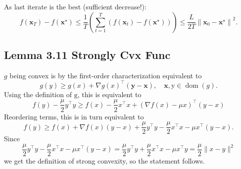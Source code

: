 As last iterate is the best (sufficient decrease!):
$$
f\left(\mathbf{x}_{T}\right)-f\left(\mathbf{x}^{\star}\right) \leq \frac{1}{T}\left(\sum_{t=1}^{T}\left(f\left(\mathbf{x}_{t}\right)-f\left(\mathbf{x}^{\star}\right)\right)\right) \leq \frac{L}{2 T}\left\|\mathbf{x}_{0}-\mathbf{x}^{\star}\right\|^{2} .
$$


\subsection*{Lemma 3.11 Strongly Cvx Func}
$g$ being convex is by the first-order characterization equivalent to
$$
g(y) \geq g(x)+\nabla g(x)^{\top}(\mathbf{y}-\mathbf{x}), \quad \mathbf{x}, \mathrm{y} \in \operatorname{dom}(g) .
$$
Using the definition of $\mathrm{g}$, this is equivalent to
$$
f(y)-\frac{\mu}{2} y^{\top} y \geq f(x)-\frac{\mu}{2} x^{\top} x+(\nabla f(x)-\mu x)^{\top}(y-x)
$$
Reordering terms, this is in turn equivalent to
$$
f(y) \geq f(x)+\nabla f(x)(y-x)+\frac{\mu}{2} y^{\top} y-\frac{\mu}{2} x^{\top} x-\mu x^{\top}(y-x) .
$$
Since
$$
\frac{\mu}{2} y^{\top} y-\frac{\mu}{2} x^{\top} x-\mu x^{\top}(y-x)=\frac{\mu}{2} y^{\top} y+\frac{\mu}{2} x^{\top} x-\mu x^{\top} y=\frac{\mu}{2}\|x-y\|^{2}
$$
we get the definition of strong convexity, so the statement follows.